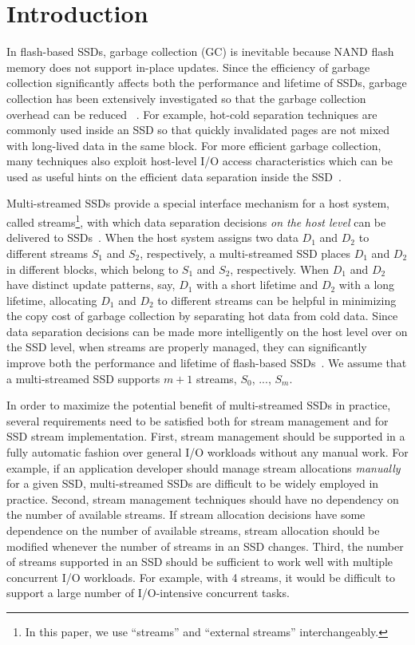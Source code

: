 \vspace{-12pt}
\section{Introduction}
\label{sec:intro}
\vspace{-4pt}
In flash-based SSDs, garbage collection (GC) is inevitable because NAND flash 
memory does not support in-place updates.  
Since the efficiency of garbage collection significantly affects  
both the performance and lifetime of SSDs, garbage collection has been extensively 
investigated so that the garbage collection overhead can be reduced
~\cite{DAC, WriteAmplification, GCGreedy, GCVictim, GCTTFlash, HotCold}.  
For example, hot-cold separation techniques are commonly used inside an SSD 
so that quickly invalidated pages are not mixed with long-lived data in the same block.   
For more efficient garbage collection, many techniques also exploit
host-level I/O access characteristics which can be used as useful hints on 
the efficient data separation inside the SSD~\cite{JiTGC, ShadowGC}.

Multi-streamed SSDs provide a special interface mechanism for 
a host system, called streams\footnote{In this paper, we use ``streams''
and ``external streams'' interchangeably.},
with which data separation decisions 
{\it on the host level} can be delivered to SSDs~\cite{T10, MultiStream}.  
When the host system assigns two data $D_1$ and $D_2$ to 
different streams $S_1$ and $S_2$, respectively, a multi-streamed SSD 
places $D_1$ and $D_2$ in different blocks, which belong to $S_1$ and $S_2$, respectively.
When $D_1$ and $D_2$ have distinct update patterns, say, $D_1$ with a short lifetime 
and $D_2$ with a long lifetime, allocating $D_1$ and $D_2$ to different streams 
can be helpful in minimizing the copy cost of
garbage collection by separating hot data from cold data.  
Since data separation decisions can be made more intelligently on the host level over on the SSD level, 
when streams are properly managed, they can significantly
improve both the performance and lifetime of 
flash-based SSDs~\cite{MultiStream, Level, FStream, vStream, AutoStream}.
We assume that a multi-streamed SSD supports $m+1$ streams, $S_0$, ..., $S_{m}$.

In order to maximize the potential benefit of multi-streamed
SSDs in practice, several requirements need to be satisfied both for 
stream management and for SSD stream implementation.
First, stream management should be supported in a fully automatic fashion 
over general I/O workloads without any manual work.
For example, if an
application developer should manage stream allocations {\it manually} for 
a given SSD, multi-streamed SSDs are difficult to be 
widely employed in practice.   
Second, stream management techniques should have no dependency on 
the number of available streams.  
If stream allocation decisions have some dependence on
the number of available streams,  
stream allocation should be modified
whenever the number of streams in an SSD changes.
Third, the number of streams supported in an SSD should be sufficient 
to work well with multiple concurrent I/O workloads.  
For example, with 4 streams, it would be difficult to support a large
number of I/O-intensive concurrent tasks.  

